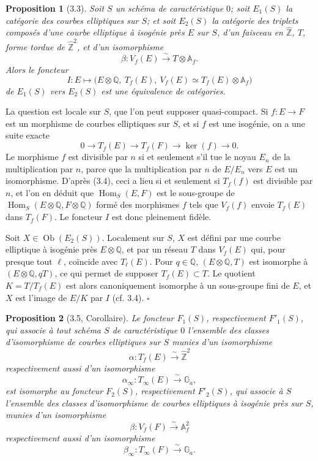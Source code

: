 \documentclass[10pt]{article}
\newcommand{\Af}{\mathbb A_f}
\newcommand{\Q}{\mathbb Q}
\newcommand{\bZ}{\widehat{\mathbb Z}}
\newcommand{\Ga}{\mathbb G_a}
\newcommand{\Hom}{\operatorname{Hom}}
\newcommand{\QED}{\hfill$\square$}
\newtheorem*{proposition}{Proposition}
\begin{document}
\begin{proposition}[3.3]
Soit $S$ un schéma de caractéristique $0$; soit $E_1(S)$ la catégorie des courbes elliptiques
sur $S$; et soit $E_2(S)$ la catégorie des triplets composés d'une courbe elliptique à
isogénie près $E$ sur $S$, d'un faisceau en $\bZ$, $T$, forme tordue de $\bZ^2$, et d'un
isomorphisme
\[
\beta:V_f(E)\xrightarrow{\sim}T\otimes\Af.
\]
Alors le foncteur
\[
I:E\longmapsto \bigl(E\otimes\Q,\ T_f(E),\ V_f(E)\simeq T_f(E)\otimes\Af\bigr)
\]
de $E_1(S)$ vers $E_2(S)$ est une équivalence de catégories.
\end{proposition}

La question est locale sur $S$, que l'on peut supposer quasi-compact. Si $f:E\to F$ est
un morphisme de courbes elliptiques sur $S$, et si $f$ est une isogénie, on a une suite
exacte
\[
0\to T_f(E)\to T_f(F)\to \ker(f)\to 0.
\tag{3.4}
\]
Le morphisme $f$ est divisible par $n$ si et seulement s'il tue le noyau $E_n$ de la
multiplication par $n$, parce que la multiplication par $n$ de $E/E_n$ vers $E$ est un
isomorphisme. D'après (3.4), ceci a lieu si et seulement si $T_f(f)$ est divisible par $n$,
et l'on en déduit que $\Hom_S(E,F)$ est le sous-groupe de $\Hom_S(E\otimes\Q,F\otimes\Q)$
formé des morphismes $f$ tels que $V_f(f)$ envoie $T_f(E)$ dans $T_f(F)$. Le foncteur
$I$ est donc pleinement fidèle.

Soit $X\in\operatorname{Ob}(E_2(S))$. Localement sur $S$, $X$ est défini par une courbe
elliptique à isogénie près $E\otimes\Q$, et par un réseau $T$ dans $V_f(E)$ qui, pour
presque tout $\ell$, coïncide avec $T_\ell(E)$. Pour $q\in\Q$, $(E\otimes\Q,T)$ est
isomorphe à $(E\otimes\Q,qT)$, ce qui permet de supposer $T_f(E)\subset T$. Le quotient
$K=T/T_f(E)$ est alors canoniquement isomorphe à un sous-groupe fini de $E$, et $X$ est
l'image de $E/K$ par $I$ (cf. 3.4). \QED

\begin{proposition}[3.5, Corollaire]
Le foncteur $F_1(S)$, respectivement $F'_1(S)$, qui associe à tout schéma $S$ de
caractéristique $0$ l'ensemble des classes d'isomorphisme de courbes elliptiques sur $S$
munies d'un isomorphisme
\[
\alpha:T_f(E)\xrightarrow{\sim}\bZ^2
\]
respectivement aussi d'un isomorphisme
\[
\alpha_\infty:T_\infty(E)\xrightarrow{\sim}\Ga,
\]
est isomorphe au foncteur $F_2(S)$, respectivement $F'_2(S)$, qui associe à $S$ l'ensemble
des classes d'isomorphisme de courbes elliptiques à isogénie près sur $S$, munies d'un
isomorphisme
\[
\beta:V_f(F)\xrightarrow{\sim}\Af^2
\]
respectivement aussi d'un isomorphisme
\[
\beta_\infty:T_\infty(F)\xrightarrow{\sim}\Ga.
\]
\end{proposition}
\end{document}
